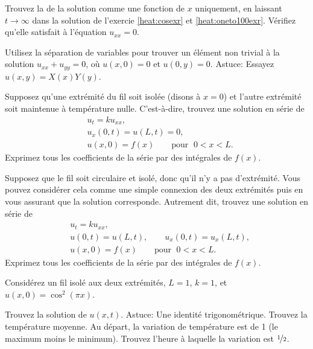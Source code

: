 \begin{exercise}
Trouvez la \emph{} de la solution comme une fonction de $x$ uniquement,
en laissant $t \to
\infty$ dans la solution de l'exercie \ref{heat:cosexr} et \ref{heat:oneto100exr}.
Vérifiez qu'elle satisfait à l'équation $u_{xx} = 0$.
\end{exercise}

\begin{exercise}
Utilisez la séparation de variables pour trouver un élément non trivial à la
solution  $ u_ {xx} + u_ {yy} = 0 $,  où $ u (x, 0) = 0 $ et $ u (0, y) = 0 $.
Astuce: Essayez$u(x,y) = X(x)Y(y)$.
\end{exercise}

\begin{exercise}[challenging]
Supposez qu'une extrémité du fil soit isolée (disons à $ x = 0 $) et
l'autre extrémité soit maintenue à température nulle.  C'est-à-dire,
trouvez une solution en série de
\begin{align*}
& u_t = k u_{xx} , \\
& u_x(0,t) = u(L,t) = 0 , \\
& u(x,0) = f(x) \qquad \text{pour } \; 0 < x < L .
\end{align*}
Exprimez tous les coefficients de la série par des intégrales de $f(x)$.
\end{exercise}

\begin{exercise}[challenging]
Supposez que le fil soit circulaire et isolé,  donc qu'il n'y a pas d'extrémité.
Vous pouvez considérer cela comme une simple connexion des deux extrémités puis
en vous assurant que la solution corresponde.
Autrement dit,  trouvez une solution en série de
\begin{align*}
& u_t = k u_{xx} , \\
& u(0,t) = u(L,t) , \qquad
u_x(0,t) = u_x(L,t) , \\
& u(x,0) = f(x) \qquad \text{pour } \; 0 < x < L .
\end{align*}
Exprimez tous les coefficients de la série par des intégrales de  $f(x)$.
\end{exercise}

\begin{exercise}
Considérez un fil isolé aux deux extrémités,  $L=1$, $k=1$,
et $u(x,0) = \cos^2(\pi x)$.
\begin{tasks}
\task
Trouvez la solution de $u(x,t)$.  Astuce: Une identité trigonométrique.
\task
Trouvez la température moyenne.
\task
Au départ,  la variation de température est de 1 (le maximum moins le minimum).
Trouvez l'heure à laquelle la variation est $\nicefrac{1}{2}$.
\end{tasks}
\end{exercise}

